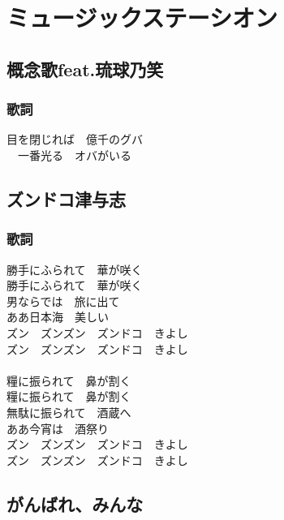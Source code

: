 \documentclass[12pt]{jsarticle}
\begin{document}
\newpage
\section{ミュージックステーシオン}
\subsection{概念歌feat.琉球乃笑}

\subsubsection{歌詞}

目を閉じれば　億千のグバ\\
　一番光る　オバがいる
\subsection{ズンドコ津与志}
\subsubsection{歌詞}
勝手にふられて　華が咲く\\
勝手にふられて　華が咲く\\
男ならでは　旅に出て\\
ああ日本海　美しい\\
ズン　ズンズン　ズンドコ　きよし\\
ズン　ズンズン　ズンドコ　きよし\\
\\
糧に振られて　鼻が割く\\
糧に振られて　鼻が割く\\
無駄に振られて　酒蔵へ\\
ああ今宵は　酒祭り\\
ズン　ズンズン　ズンドコ　きよし\\
ズン　ズンズン　ズンドコ　きよし\\

\newpage
\subsection{がんばれ、みんな}
\end{document}
